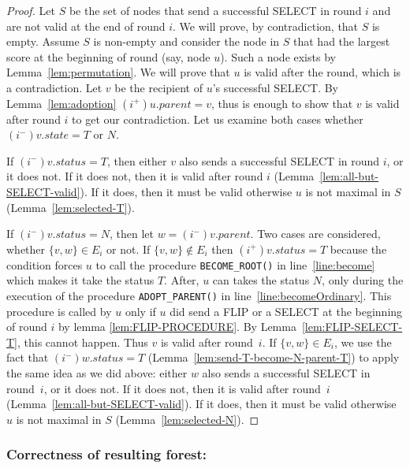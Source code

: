 \documentclass[twocolumn]{article}
\newcommand{\state}[3]{\ensuremath{(#2^{#3})#1}}
\newcommand{\vim}{\state{v}{i}{-}}
\newcommand{\wim}{\state{w}{i}{-}}
\newcommand{\uip}{\state{u}{i}{+}}
\newcommand{\vip}{\state{v}{i}{+}}
\begin{document}
\begin{proof}
Let $S$ be the set of nodes that send a successful  
SELECT in round $i$ and are not valid at the end of round $i$. We will prove, by contradiction, that $S$ is empty. Assume $S$ is non-empty and consider the node in $S$ that had the largest score at the beginning of round (say, node $u$). Such a node exists by Lemma~\ref{lem:permutation}. We will prove that $u$ is valid after the round, which is a contradiction. Let $v$ be the recipient of $u$'s successful SELECT. By Lemma~\ref{lem:adoption} $\uip.parent=v$, thus is enough to show that $v$ is valid after round $i$ to get our contradiction. Let us examine both cases whether $\vim.state= T$ or $N$.

If $\vim.status= T$, then either $v$ also sends a successful SELECT in round $i$, or it does not. If it does not, then it is valid after round $i$ (Lemma~\ref{lem:all-but-SELECT-valid}). 
If it does, then it must be valid otherwise $u$ is not maximal in $S$ (Lemma~\ref{lem:selected-T}).

If $\vim.status= N$, then let $w=\vim.parent$. Two cases are considered, whether $\{v,w\} \in E_i$ or not. If $\{v,w\} \notin E_i$ then $\vip.status=T$ because the condition forces $u$ to call the procedure \texttt{BECOME\_ROOT()} in line~\ref{line:become} which makes it take the status $T$. After, $u$ can takes the status $N$, only during the execution of the procedure \texttt{ADOPT\_PARENT()}
in line~\ref{line:becomeOrdinary}. 
This procedure is called by $u$ only 
if $u$ did send a FLIP or a SELECT 
at the beginning of round $i$ by lemma  \ref{lem:FLIP-PROCEDURE}. 
By Lemma~\ref{lem:FLIP-SELECT-T}, 
this cannot happen.
Thus $v$ is valid after round~$i$. If $\{v,w\} \in E_i$, we use the fact that $\wim.status= T$ (Lemma~\ref{lem:send-T-become-N-parent-T}) to apply the same idea as we did above: either $w$ also sends a successful SELECT in round~$i$, or it does not. If it does not, then it is valid after round~$i$ (Lemma~\ref{lem:all-but-SELECT-valid}). If it does, then it must be valid otherwise $u$ is not maximal in $S$ (Lemma~\ref{lem:selected-N}).
 \end{proof}

\subsubsection{Correctness of resulting forest:}
\end{document}
